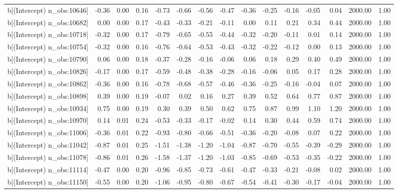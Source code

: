 \begin{table}[ht]
\begin{tabular}{rrrrrrrrrrrrrrr}
  b[(Intercept) n\_obs:10646] & -0.36 & 0.00 & 0.16 & -0.73 & -0.66 & -0.56 & -0.47 & -0.36 & -0.25 & -0.16 & -0.05 & 0.04 & 2000.00 & 1.00 \\ 
  b[(Intercept) n\_obs:10682] & 0.00 & 0.00 & 0.17 & -0.43 & -0.33 & -0.21 & -0.11 & 0.00 & 0.11 & 0.21 & 0.34 & 0.44 & 2000.00 & 1.00 \\ 
  b[(Intercept) n\_obs:10718] & -0.32 & 0.00 & 0.17 & -0.79 & -0.65 & -0.55 & -0.44 & -0.32 & -0.20 & -0.11 & 0.01 & 0.14 & 2000.00 & 1.00 \\ 
  b[(Intercept) n\_obs:10754] & -0.32 & 0.00 & 0.16 & -0.76 & -0.64 & -0.53 & -0.43 & -0.32 & -0.22 & -0.12 & 0.00 & 0.13 & 2000.00 & 1.00 \\ 
  b[(Intercept) n\_obs:10790] & 0.06 & 0.00 & 0.18 & -0.37 & -0.28 & -0.16 & -0.06 & 0.06 & 0.18 & 0.29 & 0.40 & 0.49 & 2000.00 & 1.00 \\ 
  b[(Intercept) n\_obs:10826] & -0.17 & 0.00 & 0.17 & -0.59 & -0.48 & -0.38 & -0.28 & -0.16 & -0.06 & 0.05 & 0.17 & 0.28 & 2000.00 & 1.00 \\ 
  b[(Intercept) n\_obs:10862] & -0.36 & 0.00 & 0.16 & -0.78 & -0.68 & -0.57 & -0.46 & -0.36 & -0.25 & -0.16 & -0.04 & 0.07 & 2000.00 & 1.00 \\ 
  b[(Intercept) n\_obs:10898] & 0.39 & 0.00 & 0.19 & -0.07 & 0.02 & 0.16 & 0.27 & 0.39 & 0.52 & 0.64 & 0.77 & 0.87 & 2000.00 & 1.00 \\ 
  b[(Intercept) n\_obs:10934] & 0.75 & 0.00 & 0.19 & 0.30 & 0.39 & 0.50 & 0.62 & 0.75 & 0.87 & 0.99 & 1.10 & 1.20 & 2000.00 & 1.00 \\ 
  b[(Intercept) n\_obs:10970] & 0.14 & 0.01 & 0.24 & -0.53 & -0.33 & -0.17 & -0.02 & 0.14 & 0.30 & 0.44 & 0.59 & 0.74 & 2000.00 & 1.00 \\ 
  b[(Intercept) n\_obs:11006] & -0.36 & 0.01 & 0.22 & -0.93 & -0.80 & -0.66 & -0.51 & -0.36 & -0.20 & -0.08 & 0.07 & 0.22 & 2000.00 & 1.00 \\ 
  b[(Intercept) n\_obs:11042] & -0.87 & 0.01 & 0.25 & -1.51 & -1.38 & -1.20 & -1.04 & -0.87 & -0.70 & -0.55 & -0.39 & -0.29 & 2000.00 & 1.00 \\ 
  b[(Intercept) n\_obs:11078] & -0.86 & 0.01 & 0.26 & -1.58 & -1.37 & -1.20 & -1.03 & -0.85 & -0.69 & -0.53 & -0.35 & -0.22 & 2000.00 & 1.00 \\ 
  b[(Intercept) n\_obs:11114] & -0.47 & 0.00 & 0.20 & -0.96 & -0.85 & -0.73 & -0.61 & -0.47 & -0.33 & -0.21 & -0.08 & 0.02 & 2000.00 & 1.00 \\ 
  b[(Intercept) n\_obs:11150] & -0.55 & 0.00 & 0.20 & -1.06 & -0.95 & -0.80 & -0.67 & -0.54 & -0.41 & -0.30 & -0.17 & -0.04 & 2000.00 & 1.00 \\ 

\end{tabular}
\end{table}
